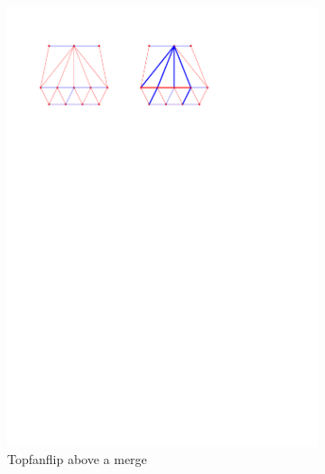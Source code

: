 \begin{figure}
    \centering
    \begin{subfigure}[b]{0.45 \textwidth}
        \includegraphics[width = \textwidth]{topFanFlips/img/merge}
        \caption{Topfanflip above a merge}
    \end{subfigure}
    ~
    \begin{subfigure}[b]{0.45 \textwidth}

\end{subfigure}
\end{figure}

